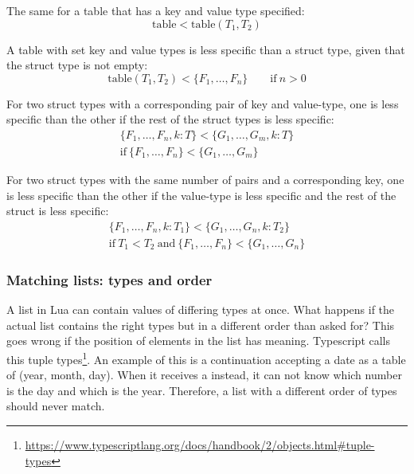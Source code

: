 The same for a table that has a key and value type specified:
\[ \mathrm{table} < \mathrm{table}(T_1, T_2) \]

A table with set key and value types is less specific than a struct type, given that the struct type is not empty:
\[ \mathrm{table}(T_1, T_2) < \{F_1, \dots, F_n\} \qquad\mathrm{if~} n > 0 \]

For two struct types with a corresponding pair of key and value-type, one is less specific than the other if the rest of the struct types is less specific:
\begin{multline*}
\{F_1, \dots, F_n, k: T\} < \{G_1, \dots, G_m, k: T\} \\
\mathrm{if~} \{F_1, \dots, F_n\} < \{G_1, \dots, G_m\}
\end{multline*}

For two struct types with the same number of pairs and a corresponding key, one is less specific than the other if the value-type is less specific and the rest of the struct is less specific:
\begin{multline*}
\{F_1, \dots, F_n, k: T_1\} < \{G_1, \dots, G_n, k: T_2\} \\
\mathrm{if~} T_1 < T_2 \mathrm{~and~} \{F_1, \dots, F_n\} < \{G_1, \dots, G_n\}
\end{multline*}


\subsubsection{Matching lists: types and order}
A list in Lua can contain values of differing types at once. What happens if the actual list contains the right types but in a different order than asked for?
This goes wrong if the position of elements in the list has meaning. Typescript calls this tuple types\footnote{\label{footnote-typescript-tuple-types}\url{https://www.typescriptlang.org/docs/handbook/2/objects.html\#tuple-types}}. An example of this is a continuation accepting a date as a table of  (year, month, day). When it receives a  instead, it can not know which number is the day and which is the year. Therefore, a list with a different order of types should never match.

